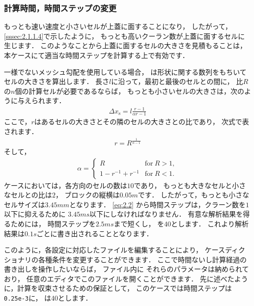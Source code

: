 \subsubsection{計算時間，時間ステップの変更}
\label{sssec:2.1.6.2}
もっとも速い速度と小さいセルが上蓋に面することになり，
したがって，\autoref{sssec:2.1.1.4}で示したように，
もっとも高いクーラン数が上蓋に面するセルに生じます．
このようなことから上蓋に面するセルの大きさを見積もることは，
本ケースにて適当な時間ステップを計算する上で有効です．

一様でないメッシュ勾配を使用している場合，
%
%
は形状に関する数列をもちいてセルの大きさを算出します．
長さ$l$に沿って，最初と最後のセルとの間に，
比$R$の$n$個の計算セルが必要であるならば，
もっとも小さいセルの大きさは，次のように与えられます．
\begin{align}
 \label{eq:2.5}
  \Delta x_{\mathrm{s}} = l\frac{r - 1}{\alpha r - 1}
\end{align}
ここで，$r$はあるセルの大きさとその隣のセルの大きさとの比であり，
次式で表されます．
\begin{align}
 \label{eq:2.6}
  r = R^{\frac{1}{n-1}}
\end{align}
そして，
\begin{align}
 \label{eq:2.7}
  \alpha =
  \begin{cases}
   R & \text{for}\ R > 1, \\
   1 - r^{-1} + r^{-1} & \text{for}\ R < 1.
  \end{cases}
\end{align}
ケースにおいては，各方向のセルの数は$10$であり，
もっとも大きなセルと小さなセルとの比は$2$，
ブロックの縦横は$0.05\unit{m}$です．
したがって，もっとも小さなセルサイズは$3.45\unit{mm}$となります．
\autoref{eq:2.2} から時間ステップは，クラーン数を$1$以下に抑えるために
$3.45\unit{ms}$以下にしなければなりません．
有意な解析結果を得るためには，
時間ステップを$2.5\unit{ms}$まで短くし，
を40とします．
これより解析結果は$0.1\unit{s}$ごとに書き出されることとなります．

このように，各設定に対応したファイルを編集することにより，
ケースディクショナリの各種条件を変更することができます．
ここで時間ないし計算経過の書き出しを操作したいならば，
ファイル内に
それらのパラメータは納められており，
任意のエディタでこのファイルを開くことができます．
先に述べたように，計算を収束させるための保証として，
このケースでは時間ステップは\texttt{0.25e-3}に，
は40とします．

